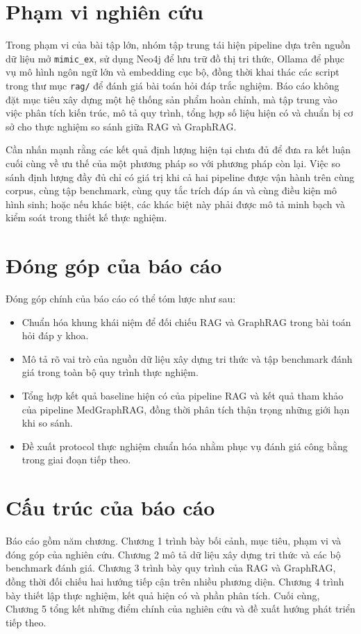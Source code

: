 \documentclass[a4paper,12pt,twoside]{report}
\begin{document}
\section{Phạm vi nghiên cứu}
Trong phạm vi của bài tập lớn, nhóm tập trung tái hiện pipeline dựa trên nguồn dữ liệu mở \texttt{mimic\_ex}, sử dụng Neo4j để lưu trữ đồ thị tri thức, Ollama để phục vụ mô hình ngôn ngữ lớn và embedding cục bộ, đồng thời khai thác các script trong thư mục \texttt{rag/} để đánh giá bài toán hỏi đáp trắc nghiệm. Báo cáo không đặt mục tiêu xây dựng một hệ thống sản phẩm hoàn chỉnh, mà tập trung vào việc phân tích kiến trúc, mô tả quy trình, tổng hợp số liệu hiện có và chuẩn bị cơ sở cho thực nghiệm so sánh giữa RAG và GraphRAG.

Cần nhấn mạnh rằng các kết quả định lượng hiện tại chưa đủ để đưa ra kết luận cuối cùng về ưu thế của một phương pháp so với phương pháp còn lại. Việc so sánh định lượng đầy đủ chỉ có giá trị khi cả hai pipeline được vận hành trên cùng corpus, cùng tập benchmark, cùng quy tắc trích đáp án và cùng điều kiện mô hình sinh; hoặc nếu khác biệt, các khác biệt này phải được mô tả minh bạch và kiểm soát trong thiết kế thực nghiệm.

\section{Đóng góp của báo cáo}
Đóng góp chính của báo cáo có thể tóm lược như sau:
\begin{itemize}[nosep]
  \item Chuẩn hóa khung khái niệm để đối chiếu RAG và GraphRAG trong bài toán hỏi đáp y khoa.
  \item Mô tả rõ vai trò của nguồn dữ liệu xây dựng tri thức và tập benchmark đánh giá trong toàn bộ quy trình thực nghiệm.
  \item Tổng hợp kết quả baseline hiện có của pipeline RAG và kết quả tham khảo của pipeline MedGraphRAG, đồng thời phân tích thận trọng những giới hạn khi so sánh.
  \item Đề xuất protocol thực nghiệm chuẩn hóa nhằm phục vụ đánh giá công bằng trong giai đoạn tiếp theo.
\end{itemize}

\section{Cấu trúc của báo cáo}
Báo cáo gồm năm chương. Chương 1 trình bày bối cảnh, mục tiêu, phạm vi và đóng góp của nghiên cứu. Chương 2 mô tả dữ liệu xây dựng tri thức và các bộ benchmark đánh giá. Chương 3 trình bày quy trình của RAG và GraphRAG, đồng thời đối chiếu hai hướng tiếp cận trên nhiều phương diện. Chương 4 trình bày thiết lập thực nghiệm, kết quả hiện có và phần phân tích. Cuối cùng, Chương 5 tổng kết những điểm chính của nghiên cứu và đề xuất hướng phát triển tiếp theo.
\end{document}
